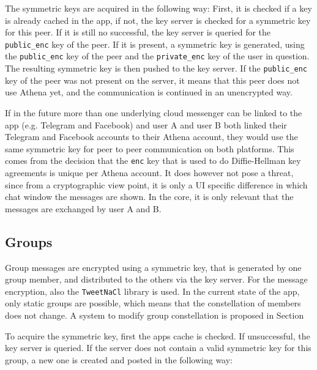 \documentclass[a4paper, oneside]{discothesis}
\begin{document}
The symmetric keys are acquired in the following way: First, it is checked if a key is already cached in the app, if not, the key server is checked for a symmetric key for this peer. If it is still no successful, the key server is queried for the \texttt{public\_enc} key of the peer. If it is present, a symmetric key is generated, using the \texttt{public\_enc} key of the peer and the \texttt{private\_enc} key of the user in question. The resulting symmetric key is then pushed to the key server. If the \texttt{public\_enc} key of the peer was not present on the server, it means that this peer does not use Athena yet, and the communication is continued in an unencrypted way.

If in the future more than one underlying cloud messenger can be linked to the app (e.g. Telegram and Facebook) and user A and user B both linked their Telegram and Facebook accounts to their Athena account, they would use the same symmetric key for peer to peer communication on both platforms. This comes from the decision that the \texttt{enc} key that is used to do Diffie-Hellman key agreements is unique per Athena account. It does however not pose a threat, since from a cryptographic view point, it is only a UI specific difference in which chat window the messages are shown. In the core, it is only relevant that the messages are exchanged by user A and B.

\subsection{Groups}

Group messages are encrypted using a symmetric key, that is generated by one group member, and distributed to the others via the key server. For the message encryption, also the \texttt{TweetNaCl} library is used. In the current state of the app, only static groups are possible, which means that the constellation of members does not change. A system to modify group constellation is proposed in Section 



To acquire the symmetric key, first the apps cache is checked. If unsuccessful, the key server is queried. If the server does not contain a valid symmetric key for this group, a new one is created and posted in the following way:
\end{document}
